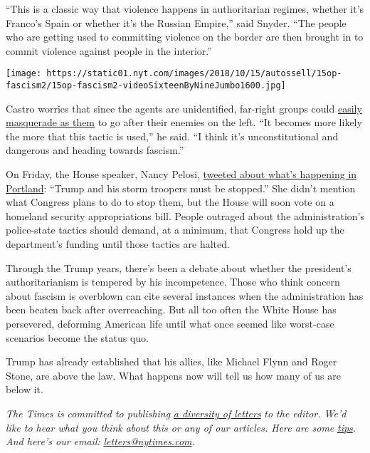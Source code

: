 ``This is a classic way that violence happens in authoritarian regimes,
whether it's Franco's Spain or whether it's the Russian Empire,'' said
Snyder. ``The people who are getting used to committing violence on the
border are then brought in to commit violence against people in the
interior.''

\texttt{[image: https://static01.nyt.com/images/2018/10/15/autossell/15op-fascism2/15op-fascism2-videoSixteenByNineJumbo1600.jpg]}

Castro worries that since the agents are unidentified, far-right groups
could
\href{https://twitter.com/JoaquinCastrotx/status/1284956181400899585?s=20}{easily
masquerade as them} to go after their enemies on the left. ``It becomes
more likely the more that this tactic is used,'' he said. ``I think it's
unconstitutional and dangerous and heading towards fascism.''

On Friday, the House speaker, Nancy Pelosi,
\href{https://twitter.com/SpeakerPelosi/status/1284294427654197248?s=20}{tweeted
about what's happening in Portland}: ``Trump and his storm troopers must
be stopped.'' She didn't mention what Congress plans to do to stop them,
but the House will soon vote on a homeland security appropriations bill.
People outraged about the administration's police-state tactics should
demand, at a minimum, that Congress hold up the department's funding
until those tactics are halted.

Through the Trump years, there's been a debate about whether the
president's authoritarianism is tempered by his incompetence. Those who
think concern about fascism is overblown can cite several instances when
the administration has been beaten back after overreaching. But all too
often the White House has persevered, deforming American life until what
once seemed like worst-case scenarios become the status quo.

Trump has already established that his allies, like Michael Flynn and
Roger Stone, are above the law. What happens now will tell us how many
of us are below it.

\emph{The Times is committed to publishing}
\href{https://www.nytimes.com/2019/01/31/opinion/letters/letters-to-editor-new-york-times-women.html}{\emph{a
diversity of letters}} \emph{to the editor. We'd like to hear what you
think about this or any of our articles. Here are some}
\href{https://help.nytimes.com/hc/en-us/articles/115014925288-How-to-submit-a-letter-to-the-editor}{\emph{tips}}\emph{.
And here's our email:}
\href{mailto:letters@nytimes.com}{\emph{letters@nytimes.com}}\emph{.}

